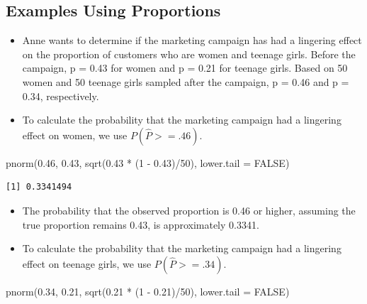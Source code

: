 \documentclass[
  letterpaper,
  DIV=11,
  numbers=noendperiod]{scrreprt}
\newenvironment{Shaded}{\begin{snugshade}}{\end{snugshade}}
\newcommand{\AttributeTok}[1]{\textcolor[rgb]{0.40,0.45,0.13}{#1}}
\newcommand{\ConstantTok}[1]{\textcolor[rgb]{0.56,0.35,0.01}{#1}}
\newcommand{\DecValTok}[1]{\textcolor[rgb]{0.68,0.00,0.00}{#1}}
\newcommand{\FloatTok}[1]{\textcolor[rgb]{0.68,0.00,0.00}{#1}}
\newcommand{\FunctionTok}[1]{\textcolor[rgb]{0.28,0.35,0.67}{#1}}
\newcommand{\NormalTok}[1]{\textcolor[rgb]{0.00,0.23,0.31}{#1}}
\newcommand{\SpecialCharTok}[1]{\textcolor[rgb]{0.37,0.37,0.37}{#1}}
\providecommand{\tightlist}{%
  \setlength{\itemsep}{0pt}\setlength{\parskip}{0pt}}\usepackage{longtable,booktabs,array}
\begin{document}
\subsection{Examples Using
Proportions}\label{examples-using-proportions}

\begin{itemize}
\tightlist
\item
  Anne wants to determine if the marketing campaign has had a lingering
  effect on the proportion of customers who are women and teenage girls.
  Before the campaign, p = 0.43 for women and p = 0.21 for teenage
  girls. Based on 50 women and 50 teenage girls sampled after the
  campaign, p = 0.46 and p = 0.34, respectively.
\item
  To calculate the probability that the marketing campaign had a
  lingering effect on women, we use \(P(\hat{P} >= .46)\).
\end{itemize}

\begin{Shaded}
\begin{Highlighting}[]
\FunctionTok{pnorm}\NormalTok{(}\FloatTok{0.46}\NormalTok{, }\FloatTok{0.43}\NormalTok{, }\FunctionTok{sqrt}\NormalTok{(}\FloatTok{0.43} \SpecialCharTok{*}\NormalTok{ (}\DecValTok{1} \SpecialCharTok{{-}} \FloatTok{0.43}\NormalTok{)}\SpecialCharTok{/}\DecValTok{50}\NormalTok{), }\AttributeTok{lower.tail =} \ConstantTok{FALSE}\NormalTok{)}
\end{Highlighting}
\end{Shaded}

\begin{verbatim}
[1] 0.3341494
\end{verbatim}

\begin{itemize}
\item
  The probability that the observed proportion is 0.46 or higher,
  assuming the true proportion remains 0.43, is approximately 0.3341.
\item
  To calculate the probability that the marketing campaign had a
  lingering effect on teenage girls, we use \(P(\hat{P} >= .34)\).
\end{itemize}

\begin{Shaded}
\begin{Highlighting}[]
\FunctionTok{pnorm}\NormalTok{(}\FloatTok{0.34}\NormalTok{, }\FloatTok{0.21}\NormalTok{, }\FunctionTok{sqrt}\NormalTok{(}\FloatTok{0.21} \SpecialCharTok{*}\NormalTok{ (}\DecValTok{1} \SpecialCharTok{{-}} \FloatTok{0.21}\NormalTok{)}\SpecialCharTok{/}\DecValTok{50}\NormalTok{), }\AttributeTok{lower.tail =} \ConstantTok{FALSE}\NormalTok{)}
\end{Highlighting}
\end{Shaded}
\end{document}
